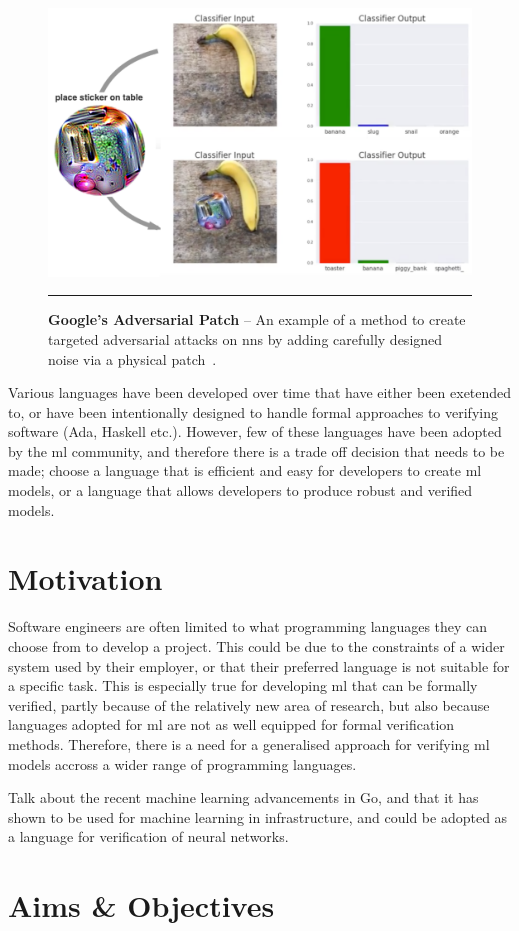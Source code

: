 \begin{figure}[H]
	\centering
        \includegraphics[width=1.0\textwidth]{media/introduction/sticker.png}
        \rule{35em}{0.5pt}
        \caption[Google's Aversarial Patch]{\textbf{Google's Adversarial Patch} -- An example of a method to create targeted adversarial attacks on \glspl{nn} by adding carefully designed noise via a physical patch~\citep{brown2018}.}\label{fig:adversarialpatch}
\end{figure}

Various languages have been developed over time that have either been exetended to, or have been intentionally designed to handle formal
approaches to verifying software (Ada, Haskell etc.). However, few of these languages have been adopted by the \gls{ml} community, and therefore
there is a trade off decision that needs to be made; choose a language that is efficient and easy for developers to create \gls{ml} models,
or a language that allows developers to produce robust and verified models.



\section{Motivation}


Software engineers are often limited to what programming languages they can choose from to develop a project. This could be
due to the constraints of a wider system used by their employer, or that their preferred language is not suitable for 
a specific task. This is especially true for developing \gls{ml} that can be formally verified, partly because of the relatively
new area of research, but also because languages adopted for \gls{ml} are not as well equipped for formal verification methods. Therefore, there is a need
for a generalised approach for verifying \gls{ml} models accross a wider range of programming languages.

Talk about the recent machine learning advancements in Go, and that it has shown to be used for machine learning in infrastructure, and could be 
adopted as a language for verification of neural networks.

\section{Aims \& Objectives}
